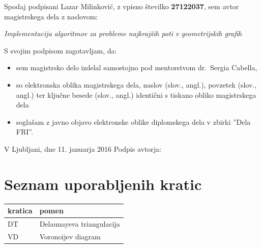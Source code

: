 \documentclass[a4paper, 12pt]{book}
\newcommand{\clearemptydoublepage}{\newpage{\pagestyle{empty}\cleardoublepage}}
\begin{document}
\vspace{1cm}
\noindent Spodaj podpisani Lazar Milinković,
z vpisno številko \textbf{27122037}, sem avtor magistrskega dela z naslovom:
   
\vspace{0.5cm}
\emph{Implementacija algoritmov za probleme najkrajših poti v geometrijskih grafih}

\vspace{1.5cm}
\noindent S svojim podpisom zagotavljam, da:
\begin{itemize}
	\item sem magistrsko delo izdelal samostojno pod mentorstvom 
		dr.\ Sergia Cabella,

	\item	so elektronska oblika magistrskega dela, naslov (slov., angl.), povzetek (slov., angl.) ter ključne besede (slov., angl.) identični s tiskano obliko magistrskega dela
	\item soglašam z javno objavo elektronske oblike diplomskega dela v zbirki ''Dela FRI''.
\end{itemize}

\vspace{1cm}
\noindent V Ljubljani, dne 11. januarja 2016 \hfill Podpis avtorja:

\clearemptydoublepage

\thispagestyle{empty}\mbox{}\vfill\null\it%
 
\rm\normalfont

\clearemptydoublepage


\def\thepage{}%
\tableofcontents{}


\clearemptydoublepage

\chapter*{Seznam uporabljenih kratic}
\begin{table}[H]
\begin{tabular*}{\textwidth}{l|l}
\textbf{kratica} & \textbf{pomen} \\
\hline
DT & Delaunayeva triangulacija \\
VD & Voronoijev diagram
\end{tabular*}
\end{table}
\end{document}
